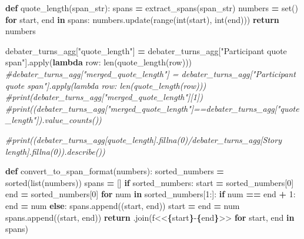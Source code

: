 \documentclass[
]{article}
\newenvironment{Shaded}{\begin{snugshade}}{\end{snugshade}}
\newcommand{\BuiltInTok}[1]{#1}
\newcommand{\CommentTok}[1]{\textcolor[rgb]{0.56,0.35,0.01}{\textit{#1}}}
\newcommand{\ControlFlowTok}[1]{\textcolor[rgb]{0.13,0.29,0.53}{\textbf{#1}}}
\newcommand{\DecValTok}[1]{\textcolor[rgb]{0.00,0.00,0.81}{#1}}
\newcommand{\KeywordTok}[1]{\textcolor[rgb]{0.13,0.29,0.53}{\textbf{#1}}}
\newcommand{\NormalTok}[1]{#1}
\newcommand{\OperatorTok}[1]{\textcolor[rgb]{0.81,0.36,0.00}{\textbf{#1}}}
\newcommand{\SpecialCharTok}[1]{\textcolor[rgb]{0.81,0.36,0.00}{\textbf{#1}}}
\newcommand{\SpecialStringTok}[1]{\textcolor[rgb]{0.31,0.60,0.02}{#1}}
\newcommand{\StringTok}[1]{\textcolor[rgb]{0.31,0.60,0.02}{#1}}
\begin{document}
\begin{Shaded}
\begin{Highlighting}[]
\KeywordTok{def}\NormalTok{ quote\_length(span\_str):}
\NormalTok{  spans }\OperatorTok{=}\NormalTok{ extract\_spans(span\_str)}
\NormalTok{  numbers }\OperatorTok{=} \BuiltInTok{set}\NormalTok{()}
  \ControlFlowTok{for}\NormalTok{ start, end }\KeywordTok{in}\NormalTok{ spans:}
\NormalTok{    numbers.update(}\BuiltInTok{range}\NormalTok{(}\BuiltInTok{int}\NormalTok{(start), }\BuiltInTok{int}\NormalTok{(end)))}
  \ControlFlowTok{return}\NormalTok{ numbers}

\NormalTok{debater\_turns\_agg[}\StringTok{"quote\_length"}\NormalTok{] }\OperatorTok{=}\NormalTok{ debater\_turns\_agg[}\StringTok{"Participant quote span"}\NormalTok{].}\BuiltInTok{apply}\NormalTok{(}\KeywordTok{lambda}\NormalTok{ row: }\BuiltInTok{len}\NormalTok{(quote\_length(row)))}
\CommentTok{\#debater\_turns\_agg["merged\_quote\_length"] = debater\_turns\_agg["Participant quote span"].apply(lambda row: len(quote\_length(row)))}
\CommentTok{\#print(debater\_turns\_agg["merged\_quote\_length"][1])}
\CommentTok{\#print((debater\_turns\_agg["merged\_quote\_length"]==debater\_turns\_agg["quote\_length"]).value\_counts())}

\CommentTok{\#print((debater\_turns\_agg[\textquotesingle{}quote\_length\textquotesingle{}].fillna(0)/debater\_turns\_agg[\textquotesingle{}Story length\textquotesingle{}].fillna(0)).describe())}


\KeywordTok{def}\NormalTok{ convert\_to\_span\_format(numbers):}
\NormalTok{    sorted\_numbers }\OperatorTok{=} \BuiltInTok{sorted}\NormalTok{(}\BuiltInTok{list}\NormalTok{(numbers))}
\NormalTok{    spans }\OperatorTok{=}\NormalTok{ []}
    \ControlFlowTok{if}\NormalTok{ sorted\_numbers:}
\NormalTok{        start }\OperatorTok{=}\NormalTok{ sorted\_numbers[}\DecValTok{0}\NormalTok{]}
\NormalTok{        end }\OperatorTok{=}\NormalTok{ sorted\_numbers[}\DecValTok{0}\NormalTok{]}
        \ControlFlowTok{for}\NormalTok{ num }\KeywordTok{in}\NormalTok{ sorted\_numbers[}\DecValTok{1}\NormalTok{:]:}
            \ControlFlowTok{if}\NormalTok{ num }\OperatorTok{==}\NormalTok{ end }\OperatorTok{+} \DecValTok{1}\NormalTok{:}
\NormalTok{                end }\OperatorTok{=}\NormalTok{ num}
            \ControlFlowTok{else}\NormalTok{:}
\NormalTok{                spans.append((start, end))}
\NormalTok{                start }\OperatorTok{=}\NormalTok{ end }\OperatorTok{=}\NormalTok{ num}
\NormalTok{        spans.append((start, end))}
    \ControlFlowTok{return} \StringTok{\textquotesingle{} \textquotesingle{}}\NormalTok{.join(}\SpecialStringTok{f\textquotesingle{}\textless{}\textless{}}\SpecialCharTok{\{}\NormalTok{start}\SpecialCharTok{\}}\SpecialStringTok{{-}}\SpecialCharTok{\{}\NormalTok{end}\SpecialCharTok{\}}\SpecialStringTok{\textgreater{}\textgreater{}\textquotesingle{}} \ControlFlowTok{for}\NormalTok{ start, end }\KeywordTok{in}\NormalTok{ spans)}


\end{Highlighting}
\end{Shaded}
\end{document}
